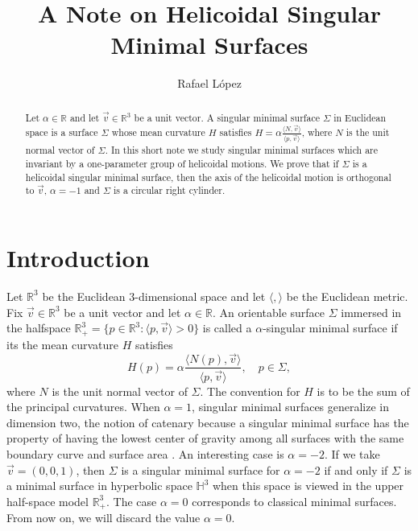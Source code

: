 \documentclass[a4paper,12pt]{amsart}
\theoremstyle{definition}
\def\r{\mathbb R}
\def\h{\mathbb H}
\def\v{\vec{v}}
\begin{document}
\title[A Note on Helicoidal Singular Minimal Surfaces]{A Note on Helicoidal Singular Minimal Surfaces}
\author{Rafael L\'opez}
\address{ Departamento de Geometr\'{\i}a y Topolog\'{\i}a\\ Universidad de Granada. 18071 Granada, Spain}

  
 


\begin{abstract} Let $\alpha\in\r$ and let $\vec{v}\in\r^3$ be a unit vector. A singular minimal surface $\Sigma$ in Euclidean space is a surface $\Sigma$ whose mean curvature $H$ satisfies $H=\alpha\frac{\langle N,\vec{v}\rangle}{\langle p,\vec{v}\rangle}$, where $N$ is the unit normal vector of $\Sigma$.  In this short note we study singular minimal surfaces which are invariant by a one-parameter  group of helicoidal motions. We prove that if $\Sigma$ is a helicoidal singular minimal surface, then the axis of the helicoidal motion is orthogonal to $\vec{v}$, $\alpha=-1$ and $\Sigma$ is a circular right cylinder.\end{abstract}

\maketitle


 
 
 
  


\section{Introduction  }

Let $\r^3$ be the Euclidean $3$-dimensional space and let   $\langle,\rangle$ be the Euclidean metric. Fix $\vec{v}\in\r^3$ be a unit vector and let $\alpha\in\r$. An orientable surface $\Sigma$ immersed in the halfspace $\r^3_+=\{p\in\r^3\colon \langle p,\vec{v}\rangle>0\}$ is called a $\alpha$-singular minimal surface if its  the mean curvature $H$  satisfies
\begin{equation}\label{eq1}
H(p)=\alpha\frac{\langle N(p),\v\rangle}{\langle p,\vec{v}\rangle},\quad p\in\Sigma,
\end{equation}
where   $N$ is the unit normal vector of $\Sigma$.  The convention for $H$ is to be the sum of the principal curvatures. When $\alpha=1$, singular minimal surfaces generalize in dimension   two, the notion of catenary because a singular minimal surface has the property   of having the lowest center of gravity among all surfaces with the same boundary curve and surface area \cite{bd,bht,dh}.  An interesting case is $\alpha=-2$. If we take $\vec{v}=(0,0,1)$, then $\Sigma$ is a singular minimal surface for $\alpha=-2$ if and only if $\Sigma$ is a minimal surface in hyperbolic space   $\h^3$ when this space is viewed in the    upper half-space model $\r_+^3$. The case $\alpha=0$ corresponds to classical minimal surfaces. From now on, we will discard the value $\alpha=0$.
\end{document}
